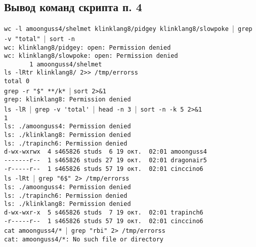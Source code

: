 \subsection*{Вывод команд скрипта п. 4}
\verb|wc -l amoonguss4/shelmet klinklang8/pidgey klinklang8/slowpoke ||\verb| grep -v "total" ||\verb| sort -n| \\
\verb|wc: klinklang8/pidgey: open: Permission denied| \\
\verb|wc: klinklang8/slowpoke: open: Permission denied| \\
\verb|       1 amoonguss4/shelmet| \\

\noindent \verb|ls -lRtr klinklang8/ 2>> /tmp/errorss| \\
\verb|total 0| \\

\noindent \verb|grep -r "$" **/k* || \verb|sort 2>&1| \\
\verb|grep: klinklang8: Permission denied| \\

\noindent \verb|ls -lR ||\verb| grep -v 'total' ||\verb| head -n 3 ||\verb| sort -n -k 5 2>&1| \\
\verb|1| \\
\verb|ls: ./amoonguss4: Permission denied| \\
\verb|ls: ./klinklang8: Permission denied| \\
\verb|ls: ./trapinch6: Permission denied| \\
\verb|d-wx-wxrwx  4 s465826 studs  6 19 окт.  02:01 amoonguss4| \\
\verb|-------r--  1 s465826 studs 27 19 окт.  02:01 dragonair5| \\
\verb|-r-----r--  1 s465826 studs 57 19 окт.  02:01 cinccino6| \\

\noindent \verb|ls -lRt ||\verb| grep "6$" 2> /tmp/errorss| \\
\verb|ls: ./amoonguss4: Permission denied| \\
\verb|ls: ./trapinch6: Permission denied| \\
\verb|ls: ./klinklang8: Permission denied| \\
\verb|d-wx-wxr-x  5 s465826 studs  7 19 окт.  02:01 trapinch6| \\
\verb|-r-----r--  1 s465826 studs 57 19 окт.  02:01 cinccino6| \\

\noindent \verb|cat amoonguss4/* ||\verb| grep "rbi" 2> /tmp/errorss| \\
\verb|cat: amoonguss4/*: No such file or directory| \\

